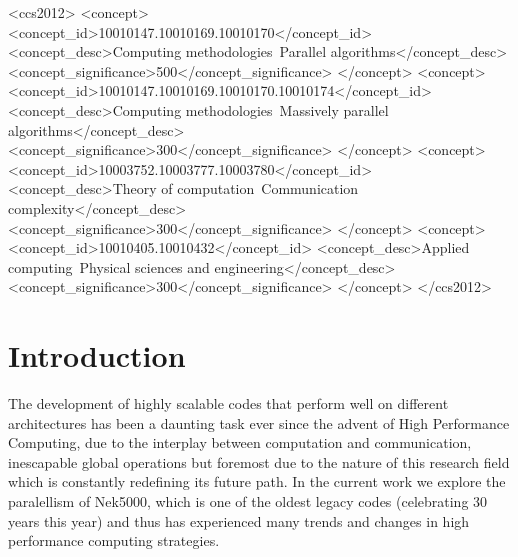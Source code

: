 \documentclass{sig-alternate}
\begin{document}
%
 \begin{CCSXML}
<ccs2012>
<concept>
<concept_id>10010147.10010169.10010170</concept_id>
<concept_desc>Computing methodologies~Parallel algorithms</concept_desc>
<concept_significance>500</concept_significance>
</concept>
<concept>
<concept_id>10010147.10010169.10010170.10010174</concept_id>
<concept_desc>Computing methodologies~Massively parallel algorithms</concept_desc>
<concept_significance>300</concept_significance>
</concept>
<concept>
<concept_id>10003752.10003777.10003780</concept_id>
<concept_desc>Theory of computation~Communication complexity</concept_desc>
<concept_significance>300</concept_significance>
</concept>
<concept>
<concept_id>10010405.10010432</concept_id>
<concept_desc>Applied computing~Physical sciences and engineering</concept_desc>
<concept_significance>300</concept_significance>
</concept>
</ccs2012>
\end{CCSXML}



%
%

%
%
\printccsdesc



\section{Introduction}
The development of highly scalable codes that perform well on different architectures has been a daunting task ever since the advent of High Performance Computing, due to the interplay between computation and communication, inescapable global operations but foremost due to the nature of this research field which is constantly redefining its future path. In the current work we explore the paralellism of Nek5000, which is one of the oldest legacy codes (celebrating 30 years this year) and thus has experienced many trends and changes in high performance computing strategies.
\end{document}
